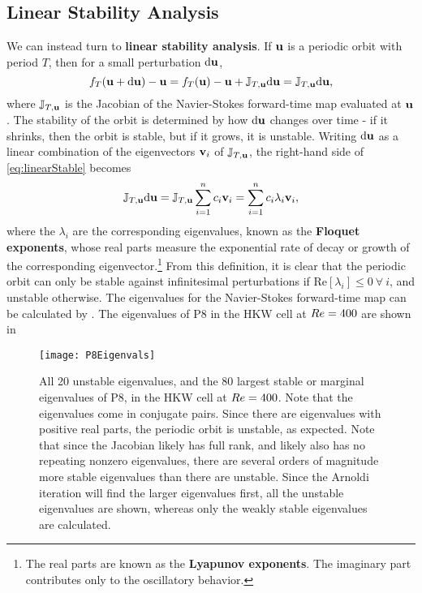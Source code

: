 \subsection{Linear Stability Analysis}

We can instead turn to {\bf linear stability analysis}. If $\mathbf{u}$ is a periodic orbit with period $T$, then for a small perturbation ${\bf \textrm{d}}\mathbf{u}$, 
\begin{equation}\label{eq:linearStable}
 f_T(\mathbf{u} + {\bf \textrm{d}}\mathbf{u}) - \mathbf{u} =  f_T(\mathbf{u}) - \mathbf{u} + \mathbb{J}_{T,\mathbf{u}}{\bf \textrm{d}}\mathbf{u} =  \mathbb{J}_{T,\mathbf{u}}{\bf \textrm{d}}\mathbf{u},
\end{equation} 
where $ \mathbb{J}_{T,\mathbf{u}}$ is the Jacobian of the Navier-Stokes forward-time map evaluated at $\mathbf{u}$. The stability of the orbit is determined by how  ${\bf \textrm{d}}\mathbf{u}$ changes over time - if it shrinks, then the orbit is stable, but if it grows, it is unstable. Writing  ${\bf \textrm{d}}\mathbf{u}$ as a linear combination of the eigenvectors $\mathbf{v}_i$ of  $ \mathbb{J}_{T,\mathbf{u}}$, the right-hand side of \eqref{eq:linearStable} becomes
\begin{equation}\label{eq:oneOrbit}
 \mathbb{J}_{T,\Vector{u}}{\bf \textrm{d}}\Vector{u} =  \mathbb{J}_{T,\Vector{u}}\sum{i = 1}{n}{c_i\Vector{v}_i} = \sum{i = 1}{n}{c_i\lambda_i\Vector{v}_i},
\end{equation}  
where the $\lambda_i$ are the corresponding eigenvalues, known as the {\bf Floquet exponents}, whose real parts measure the exponential rate of decay or growth of the corresponding eigenvector.\footnote{The real parts are known as the {\bf Lyapunov exponents}. The imaginary part contributes only to the oscillatory behavior.}   From this definition, it is clear that the periodic orbit can only be stable against infinitesimal perturbations if $\textrm{Re}[\lambda_i]  \leq 0~\forall~i$, and unstable otherwise. The eigenvalues for the Navier-Stokes forward-time map can be calculated by . The eigenvalues of P8 in the HKW cell at $Re=400$ are shown in 

\begin{figure}[h]
\texttt{[image: P8Eigenvals]}
\caption{All 20 unstable eigenvalues, and the 80 largest stable or marginal eigenvalues of P8, in the HKW cell at $Re=400$. Note that the eigenvalues come in conjugate pairs. Since there are eigenvalues with positive real parts, the periodic orbit is unstable, as expected. Note that since the Jacobian likely has full rank, and likely also has no repeating nonzero eigenvalues, there are several orders of magnitude more stable eigenvalues than there are unstable. Since the Arnoldi iteration will find the larger eigenvalues first, all the unstable eigenvalues are shown, whereas only the weakly stable eigenvalues are calculated.}\label{fig:P8Eigenvals}
\end{figure}

